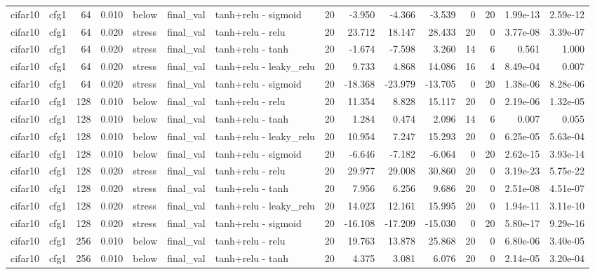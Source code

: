 \begin{table}[htbp]
{\begin{tabular}{@{}llrrlllrrrrrrrr@{}}
cifar10 & cfg1 & 64 & 0.010 & below & final\_val & tanh+relu - sigmoid & 20 & -3.950 & -4.366 & -3.539 & 0 & 20 & 1.99e-13 & 2.59e-12 \\
cifar10 & cfg1 & 64 & 0.020 & stress & final\_val & tanh+relu - relu & 20 & 23.712 & 18.147 & 28.433 & 20 & 0 & 3.77e-08 & 3.39e-07 \\
cifar10 & cfg1 & 64 & 0.020 & stress & final\_val & tanh+relu - tanh & 20 & -1.674 & -7.598 & 3.260 & 14 & 6 & 0.561 & 1.000 \\
cifar10 & cfg1 & 64 & 0.020 & stress & final\_val & tanh+relu - leaky\_relu & 20 & 9.733 & 4.868 & 14.086 & 16 & 4 & 8.49e-04 & 0.007 \\
cifar10 & cfg1 & 64 & 0.020 & stress & final\_val & tanh+relu - sigmoid & 20 & -18.368 & -23.979 & -13.705 & 0 & 20 & 1.38e-06 & 8.28e-06 \\
cifar10 & cfg1 & 128 & 0.010 & below & final\_val & tanh+relu - relu & 20 & 11.354 & 8.828 & 15.117 & 20 & 0 & 2.19e-06 & 1.32e-05 \\
cifar10 & cfg1 & 128 & 0.010 & below & final\_val & tanh+relu - tanh & 20 & 1.284 & 0.474 & 2.096 & 14 & 6 & 0.007 & 0.055 \\
cifar10 & cfg1 & 128 & 0.010 & below & final\_val & tanh+relu - leaky\_relu & 20 & 10.954 & 7.247 & 15.293 & 20 & 0 & 6.25e-05 & 5.63e-04 \\
cifar10 & cfg1 & 128 & 0.010 & below & final\_val & tanh+relu - sigmoid & 20 & -6.646 & -7.182 & -6.064 & 0 & 20 & 2.62e-15 & 3.93e-14 \\
cifar10 & cfg1 & 128 & 0.020 & stress & final\_val & tanh+relu - relu & 20 & 29.977 & 29.008 & 30.860 & 20 & 0 & 3.19e-23 & 5.75e-22 \\
cifar10 & cfg1 & 128 & 0.020 & stress & final\_val & tanh+relu - tanh & 20 & 7.956 & 6.256 & 9.686 & 20 & 0 & 2.51e-08 & 4.51e-07 \\
cifar10 & cfg1 & 128 & 0.020 & stress & final\_val & tanh+relu - leaky\_relu & 20 & 14.023 & 12.161 & 15.995 & 20 & 0 & 1.94e-11 & 3.11e-10 \\
cifar10 & cfg1 & 128 & 0.020 & stress & final\_val & tanh+relu - sigmoid & 20 & -16.108 & -17.209 & -15.030 & 0 & 20 & 5.80e-17 & 9.29e-16 \\
cifar10 & cfg1 & 256 & 0.010 & below & final\_val & tanh+relu - relu & 20 & 19.763 & 13.878 & 25.868 & 20 & 0 & 6.80e-06 & 3.40e-05 \\
cifar10 & cfg1 & 256 & 0.010 & below & final\_val & tanh+relu - tanh & 20 & 4.375 & 3.081 & 6.076 & 20 & 0 & 2.14e-05 & 3.20e-04 \\

\end{tabular}}
\end{table}
